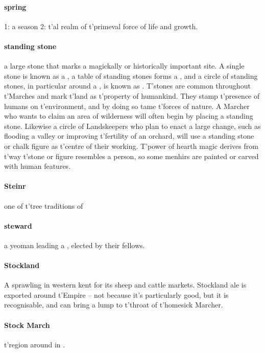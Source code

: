 \paragraph{spring} 1: a season 2: t'\allowbreak {}al realm of t'\allowbreak primeval force of life and growth.
\paragraph{standing stone} a large stone that marks a magickally or historically important site. A single stone is known as a , a table of standing stones forms a , and a circle of standing stones, in particular around a , is known as . T'stones are common throughout t'\allowbreak Marches and mark t'\allowbreak land as t'\allowbreak property of humankind. They stamp t'\allowbreak presence of humans on t'\allowbreak environment, and by doing so tame t'\allowbreak forces of nature. A Marcher who wants to claim an area of wilderness will often begin by placing a standing stone. Likewise a circle of Landskeepers who plan to enact a large change, such as flooding a valley or improving t'\allowbreak fertility of an orchard, will use a standing stone or chalk figure as t'\allowbreak centre of their working. T'power of hearth magic derives from t'\allowbreak way t'\allowbreak stone or figure resembles a person, so some menhirs are painted or carved with human features. 
\paragraph{Steinr} one of t'\allowbreak tree traditions of 
\paragraph{steward} a yeoman leading a , elected by their fellows.
\paragraph{Stockland} A sprawling  in western  kent for its sheep and cattle markets. Stockland ale is exported around t'\allowbreak Empire – not because it's particularly good, but it is recognisable, and can bring a lump to t'\allowbreak throat of t'\allowbreak homesick Marcher. 
\paragraph{Stock March} t'\allowbreak region around  in .
